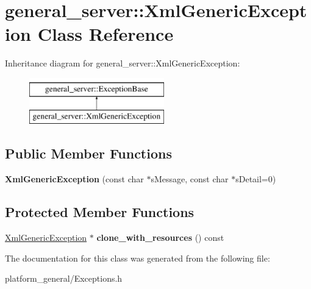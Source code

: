\hypertarget{classgeneral__server_1_1XmlGenericException}{\section{general\-\_\-server\-:\-:\-Xml\-Generic\-Exception \-Class \-Reference}
\label{classgeneral__server_1_1XmlGenericException}
}
\-Inheritance diagram for general\-\_\-server\-:\-:\-Xml\-Generic\-Exception\-:\begin{figure}[H]
\begin{center}
\leavevmode
\includegraphics[height=2.000000cm]{classgeneral__server_1_1XmlGenericException}
\end{center}
\end{figure}
\subsection*{\-Public \-Member \-Functions}
\begin{DoxyCompactItemize}
\item 
\hypertarget{classgeneral__server_1_1XmlGenericException_ac54f2133b0d2b44a39e01d45a06ca5ac}{{\bfseries \-Xml\-Generic\-Exception} (const char $\ast$s\-Message, const char $\ast$s\-Detail=0)}\label{classgeneral__server_1_1XmlGenericException_ac54f2133b0d2b44a39e01d45a06ca5ac}

\end{DoxyCompactItemize}
\subsection*{\-Protected \-Member \-Functions}
\begin{DoxyCompactItemize}
\item 
\hypertarget{classgeneral__server_1_1XmlGenericException_aea0818fb4d2e8547b8e13c177e0293e0}{\hyperlink{classgeneral__server_1_1XmlGenericException}{\-Xml\-Generic\-Exception} $\ast$ {\bfseries clone\-\_\-with\-\_\-resources} () const }\label{classgeneral__server_1_1XmlGenericException_aea0818fb4d2e8547b8e13c177e0293e0}

\end{DoxyCompactItemize}


\-The documentation for this class was generated from the following file\-:\begin{DoxyCompactItemize}
\item 
platform\-\_\-general/\-Exceptions.\-h\end{DoxyCompactItemize}
